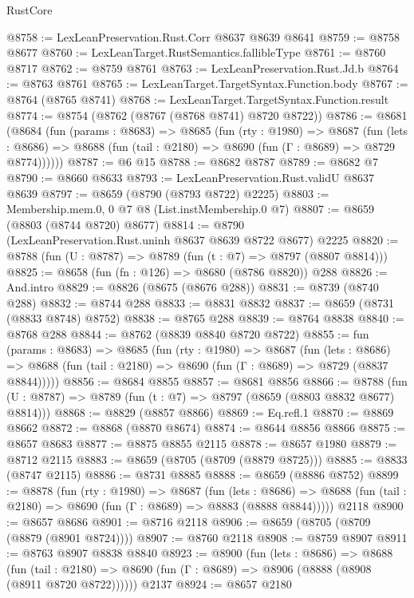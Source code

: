\begin{lexlean}{RustCore}
\begin{coremodule}
@8758 := LexLeanPreservation.Rust.Corr @8637 @8639 @8641
@8759 := @8758 @8677
@8760 := LexLeanTarget.RustSemantics.fallibleType
@8761 := @8760 @8717
@8762 := @8759 @8761
@8763 := LexLeanPreservation.Rust.Jd.b
@8764 := @8763 @8761
@8765 := LexLeanTarget.TargetSyntax.Function.body
@8767 := @8764 (@8765 @8741)
@8768 := LexLeanTarget.TargetSyntax.Function.result
@8774 := @8754 (@8762 (@8767 (@8768 @8741) @8720 @8722))
@8786 := @8681
    (@8684
      (fun (params : @8683) =>
      @8685
        (fun (rty : @1980) =>
        @8687
          (fun (lets : @8686) =>
          @8688 (fun (tail : @2180) => @8690 (fun (Γ : @8689) => @8729 @8774))))))
@8787 := @6 @15
@8788 := @8682 @8787
@8789 := @8682 @7
@8790 := @8660 @8633
@8793 := LexLeanPreservation.Rust.validU @8637 @8639
@8797 := @8659 (@8790 (@8793 @8722) @2225)
@8803 := Membership.mem.{0, 0} @7 @8 (List.instMembership.{0} @7)
@8807 := @8659 (@8803 (@8744 @8720) @8677)
@8814 := @8790 (LexLeanPreservation.Rust.uninh @8637 @8639 @8722 @8677) @2225
@8820 := @8788 (fun (U : @8787) => @8789 (fun (t : @7) => @8797 (@8807 @8814)))
@8825 := @8658 (fun (fn : @126) => @8680 (@8786 @8820)) @288
@8826 := And.intro
@8829 := @8826 (@8675 (@8676 @288))
@8831 := @8739 (@8740 @288)
@8832 := @8744 @288
@8833 := @8831 @8832
@8837 := @8659 (@8731 (@8833 @8748) @8752)
@8838 := @8765 @288
@8839 := @8764 @8838
@8840 := @8768 @288
@8844 := @8762 (@8839 @8840 @8720 @8722)
@8855 := fun (params : @8683) =>
  @8685
    (fun (rty : @1980) =>
    @8687
      (fun (lets : @8686) =>
      @8688 (fun (tail : @2180) => @8690 (fun (Γ : @8689) => @8729 (@8837 @8844)))))
@8856 := @8684 @8855
@8857 := @8681 @8856
@8866 := @8788 (fun (U : @8787) => @8789 (fun (t : @7) => @8797 (@8659 (@8803 @8832 @8677) @8814)))
@8868 := @8829 (@8857 @8866)
@8869 := Eq.refl.{1}
@8870 := @8869 @8662
@8872 := @8868 (@8870 @8674)
@8874 := @8644 @8856 @8866
@8875 := @8657 @8683
@8877 := @8875 @8855 @2115
@8878 := @8657 @1980
@8879 := @8712 @2115
@8883 := @8659 (@8705 (@8709 (@8879 @8725)))
@8885 := @8833 (@8747 @2115)
@8886 := @8731 @8885
@8888 := @8659 (@8886 @8752)
@8899 := @8878
    (fun (rty : @1980) =>
    @8687
      (fun (lets : @8686) =>
      @8688 (fun (tail : @2180) => @8690 (fun (Γ : @8689) => @8883 (@8888 @8844)))))
    @2118
@8900 := @8657 @8686
@8901 := @8716 @2118
@8906 := @8659 (@8705 (@8709 (@8879 (@8901 @8724))))
@8907 := @8760 @2118
@8908 := @8759 @8907
@8911 := @8763 @8907 @8838 @8840
@8923 := @8900
    (fun (lets : @8686) =>
    @8688
      (fun (tail : @2180) => @8690 (fun (Γ : @8689) => @8906 (@8888 (@8908 (@8911 @8720 @8722))))))
    @2137
@8924 := @8657 @2180

\end{coremodule}
\end{lexlean}
